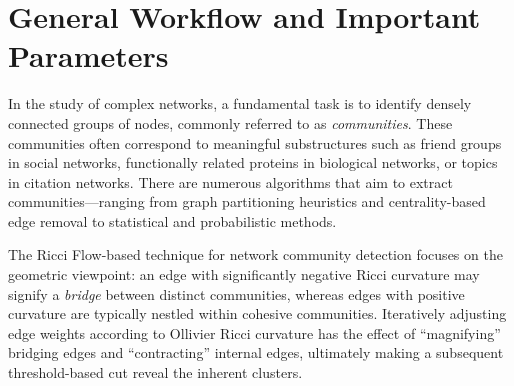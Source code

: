 
\section{General Workflow and Important Parameters}
\label{sec:ricci_flow_networks_applications}

In the study of complex networks, a fundamental task is to identify densely connected groups of nodes, commonly referred to as \emph{communities}. These communities often correspond to meaningful substructures such as friend groups in social networks, functionally related proteins in biological networks, or topics in citation networks. There are numerous algorithms that aim to extract communities---ranging from graph partitioning heuristics and centrality-based edge removal to statistical and probabilistic methods.

The Ricci Flow-based technique for network community detection focuses on the geometric viewpoint: an edge with significantly negative Ricci curvature may signify a \emph{bridge} between distinct communities, whereas edges with positive curvature are typically nestled within cohesive communities. Iteratively adjusting edge weights according to Ollivier Ricci curvature has the effect of “magnifying” bridging edges and “contracting” internal edges, ultimately making a subsequent threshold-based cut reveal the inherent clusters.

